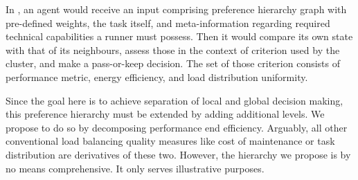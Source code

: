 In \cite{murashov-2022}, an agent would receive an input comprising preference hierarchy graph with pre-defined weights, the task itself, and meta-information regarding required technical capabilities a runner must possess.
Then it would compare its own state with that of its neighbours, assess those in the context of criterion used by the cluster, and make a pass-or-keep decision.
The set of those criterion consists of performance metric, energy efficiency, and load distribution uniformity.

Since the goal here is to achieve separation of local and global decision making, this preference hierarchy must be extended by adding additional levels.
We propose to do so by decomposing performance end efficiency.
Arguably, all other conventional load balancing quality measures like cost of maintenance or task distribution are derivatives of these two.
However, the hierarchy we propose is by no means comprehensive.
It only serves illustrative purposes.
